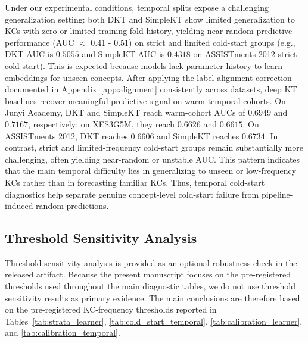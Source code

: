 Under our experimental conditions, temporal splits expose a challenging generalization setting: both DKT and SimpleKT show limited generalization to KCs with zero or limited training-fold history, yielding near-random predictive performance (AUC $\approx$ 0.41 - 0.51) on strict and limited cold-start groups (e.g., DKT AUC is $0.5055$ and SimpleKT AUC is $0.4318$ on ASSISTments 2012 strict cold-start). This is expected because models lack parameter history to learn embeddings for unseen concepts. After applying the label-alignment correction documented in Appendix~\ref{app:alignment} consistently across datasets, deep KT baselines recover meaningful predictive signal on warm temporal cohorts. On Junyi Academy, DKT and SimpleKT reach warm-cohort AUCs of $0.6949$ and $0.7167$, respectively; on XES3G5M, they reach $0.6626$ and $0.6615$. On ASSISTments 2012, DKT reaches $0.6606$ and SimpleKT reaches $0.6734$. In contrast, strict and limited-frequency cold-start groups remain substantially more challenging, often yielding near-random or unstable AUC. This pattern indicates that the main temporal difficulty lies in generalizing to unseen or low-frequency KCs rather than in forecasting familiar KCs. Thus, temporal cold-start diagnostics help separate genuine concept-level cold-start failure from pipeline-induced random predictions.

\subsection{Threshold Sensitivity Analysis}
Threshold sensitivity analysis is provided as an optional robustness check in the released artifact. Because the present manuscript focuses on the pre-registered thresholds used throughout the main diagnostic tables, we do not use threshold sensitivity results as primary evidence. The main conclusions are therefore based on the pre-registered KC-frequency thresholds reported in Tables~\ref{tab:strata_learner}, \ref{tab:cold_start_temporal}, \ref{tab:calibration_learner}, and \ref{tab:calibration_temporal}.

